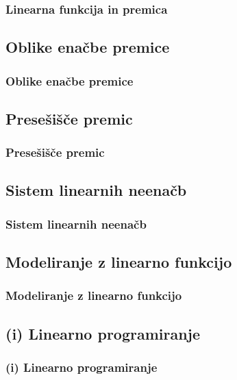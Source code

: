        \begin{frame}
            \frametitle{Linearna funkcija in premica}
        \end{frame}

    \subsection{Oblike enačbe premice}

        \begin{frame}
            \frametitle{Oblike enačbe premice}
        \end{frame}

    \subsection{Presešišče premic}

        \begin{frame}
            \frametitle{Presešišče premic}
        \end{frame}

    \subsection{Sistem linearnih neenačb}

        \begin{frame}
            \frametitle{Sistem linearnih neenačb}
        \end{frame}

    \subsection{Modeliranje z linearno funkcijo}

        \begin{frame}
            \frametitle{Modeliranje z linearno funkcijo}
        \end{frame}

    \subsection{(i) Linearno programiranje}
        
        \begin{frame}
            \frametitle{(i) Linearno programiranje}
        \end{frame}

